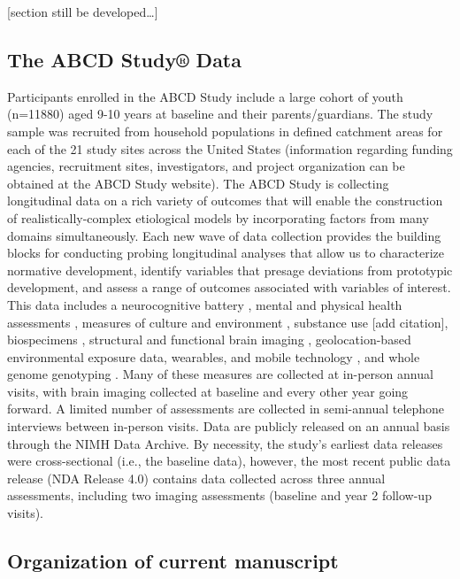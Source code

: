 \documentclass[
  10pt,
  letterpaper,
]{article}
\begin{document}
{[}section still be developed\ldots{]}

\hypertarget{the-abcd-study-data}{%
\subsection{The ABCD Study® Data}\label{the-abcd-study-data}}

Participants enrolled in the ABCD Study include a large cohort of youth
(n=11880) aged 9-10 years at baseline and their parents/guardians. The
study sample was recruited from household populations in defined
catchment areas for each of the 21 study sites across the United States
(information regarding funding agencies, recruitment sites,
investigators, and project organization can be obtained at the ABCD
Study website). The ABCD Study is collecting longitudinal data on a rich
variety of outcomes that will enable the construction of
realistically-complex etiological models by incorporating factors from
many domains simultaneously. Each new wave of data collection provides
the building blocks for conducting probing longitudinal analyses that
allow us to characterize normative development, identify variables that
presage deviations from prototypic development, and assess a range of
outcomes associated with variables of interest. This data includes a
neurocognitive battery \citep{luciana2018a, thompson2019}, mental and
physical health assessments \citep{barch2018}, measures of culture and
environment \citep{zucker2018}, substance use {[}add citation{]},
biospecimens \citep{uban2018}, structural and functional brain imaging
\citep{casey2018, hagler2019}, geolocation-based environmental exposure
data, wearables, and mobile technology \citep{bagot2018}, and whole
genome genotyping \citep{loughnan2020}. Many of these measures are
collected at in-person annual visits, with brain imaging collected at
baseline and every other year going forward. A limited number of
assessments are collected in semi-annual telephone interviews between
in-person visits. Data are publicly released on an annual basis through
the NIMH Data Archive. By necessity, the study's earliest data releases
were cross-sectional (i.e., the baseline data), however, the most recent
public data release (NDA Release 4.0) contains data collected across
three annual assessments, including two imaging assessments (baseline
and year 2 follow-up visits).

\hypertarget{organization-of-current-manuscript}{%
\subsection{Organization of current
manuscript}\label{organization-of-current-manuscript}}
\end{document}
